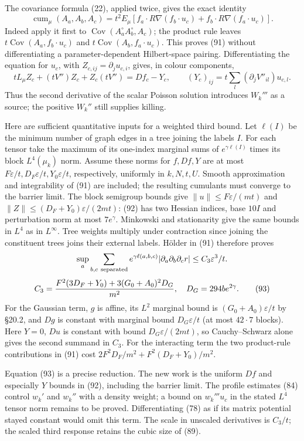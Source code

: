 \documentclass[11pt,a4paper]{article}
\begin{document}
The covariance formula (22), applied twice, gives the exact identity
\[\operatorname{cum}_\mu(A_a,A_b,A_c)
=t^2E_\mu[f_a\cdot R\nabla(f_b\cdot u_c)
                 +f_b\cdot R\nabla(f_a\cdot u_c)].\tag{91}\] Indeed
apply it first to \(\operatorname{Cov}(A_a^\circ A_b^\circ,A_c)\); the
product rule leaves \(t\operatorname{Cov}(A_a,f_b\cdot u_c)\) and
\(t\operatorname{Cov}(A_b,f_a\cdot u_c)\). This proves (91) without
differentiating a parameter-dependent Hilbert-space pairing.
Differentiating the equation for \(u_c\), with
\(Z_{c,ij}=\partial_j u_{c,i}\), gives, in colour components,
\[tL_\mu Z_c+(tV'')Z_c+Z_c(tV'')=Df_c-Y_c,\qquad
(Y_c)_{ij}=t\sum_l(\partial_j V''_{il})u_{c,l}.\tag{92}\] Thus the
second derivative of the scalar Poisson solution introduces \(W_k'''\)
as a source; the positive \(W_k''\) still supplies killing.

Here are sufficient quantitative inputs for a weighted third bound. Let
\(\ell(I)\) be the minimum number of graph edges in a tree joining the
labels \(I\). For each tensor take the maximum of its one-index marginal
sums of \(e^{\gamma\ell(I)}\) times its block \(L^4(\mu_k)\) norm.
Assume these norms for \(f,Df,Y\) are at most
\(F\varepsilon/t,D_F\varepsilon/t,Y_0\varepsilon/t\), respectively,
uniformly in \(k,N,t,U\). Smooth approximation and integrability of (91)
are included; the resulting cumulants must converge to the barrier
limit. The block semigroup bounds give \(\|u\|\le F\varepsilon/(mt)\)
and \(\|Z\|\le(D_F+Y_0)\varepsilon/(2mt)\): (92) has two Hessian
indices, base \(10I\) and perturbation norm at most \(7e^\gamma\).
Minkowski and stationarity give the same bounds in \(L^4\) as in
\(L^\infty\). Tree weights multiply under contraction since joining the
constituent trees joins their external labels. Hölder in (91) therefore
proves \[\sup_a\sum_{b,c\ {\rm separated}}e^{\gamma\ell(a,b,c)}
|\partial_a\partial_b\partial_c r|
\le C_3\varepsilon^3/t.\] \[
C_3={F^2(3D_F+Y_0)+3(G_0+A_0)^2D_G\over m^2},
\quad D_G=294b e^{2\gamma}.\tag{93}\] For the Gaussian term, \(g\) is
affine, its \(L^2\) marginal bound is \((G_0+A_0)\varepsilon/t\) by
§20.2, and \(Dg\) is constant with marginal bound \(D_G\varepsilon/t\)
(at most \(42\cdot7\) blocks). Here \(Y=0\), \(Du\) is constant with
bound \(D_G\varepsilon/(2mt)\), so Cauchy--Schwarz alone gives the
second summand in \(C_3\). For the interacting term the two product-rule
contributions in (91) cost \(2F^2D_F/m^2+F^2(D_F+Y_0)/m^2\).

Equation (93) is a precise reduction. The new work is the uniform \(Df\)
and especially \(Y\) bounds in (92), including the barrier limit. The
profile estimates (84) control \(w_k'\) and \(w_k''\) with a density
weight; a bound on \(w_k'''u_c\) in the stated \(L^4\) tensor norm
remains to be proved. Differentiating (78) as if its matrix potential
stayed constant would omit this term. The scale in unscaled derivatives
is \(C_3/t\); the scaled third response retains the cubic size of (89).
\end{document}
